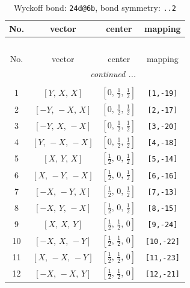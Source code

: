 \documentclass[fleqn,8pt]{jsarticle}
\begin{document}
\begin{longtable}{cccc}
\caption{Wyckoff bond: {\tt 24d@6b}, bond symmetry: {\tt ..2}}
 \\
 \hline \hline
No. & vector & center & mapping \\ \hline \endfirsthead

\multicolumn{3}{l}{\tablename\ \thetable{}} \\
 \hline \hline
No. & vector & center & mapping \\ \hline \endhead

 \hline \hline
\multicolumn{3}{r}{\footnotesize\it continued ...} \\ \endfoot

 \hline \hline
\multicolumn{3}{r}{} \\ \endlastfoot

1 & $\left[ Y,\, X,\, X \right]$ & $\left[ 0,\, \frac{1}{2},\, \frac{1}{2} \right]$ & {\tt [1,-19]} \\ \hline
2 & $\left[ - Y,\, - X,\, X \right]$ & $\left[ 0,\, \frac{1}{2},\, \frac{1}{2} \right]$ & {\tt [2,-17]} \\ \hline
3 & $\left[ - Y,\, X,\, - X \right]$ & $\left[ 0,\, \frac{1}{2},\, \frac{1}{2} \right]$ & {\tt [3,-20]} \\ \hline
4 & $\left[ Y,\, - X,\, - X \right]$ & $\left[ 0,\, \frac{1}{2},\, \frac{1}{2} \right]$ & {\tt [4,-18]} \\ \hline
5 & $\left[ X,\, Y,\, X \right]$ & $\left[ \frac{1}{2},\, 0,\, \frac{1}{2} \right]$ & {\tt [5,-14]} \\ \hline
6 & $\left[ X,\, - Y,\, - X \right]$ & $\left[ \frac{1}{2},\, 0,\, \frac{1}{2} \right]$ & {\tt [6,-16]} \\ \hline
7 & $\left[ - X,\, - Y,\, X \right]$ & $\left[ \frac{1}{2},\, 0,\, \frac{1}{2} \right]$ & {\tt [7,-13]} \\ \hline
8 & $\left[ - X,\, Y,\, - X \right]$ & $\left[ \frac{1}{2},\, 0,\, \frac{1}{2} \right]$ & {\tt [8,-15]} \\ \hline
9 & $\left[ X,\, X,\, Y \right]$ & $\left[ \frac{1}{2},\, \frac{1}{2},\, 0 \right]$ & {\tt [9,-24]} \\ \hline
10 & $\left[ - X,\, X,\, - Y \right]$ & $\left[ \frac{1}{2},\, \frac{1}{2},\, 0 \right]$ & {\tt [10,-22]} \\ \hline
11 & $\left[ X,\, - X,\, - Y \right]$ & $\left[ \frac{1}{2},\, \frac{1}{2},\, 0 \right]$ & {\tt [11,-23]} \\ \hline
12 & $\left[ - X,\, - X,\, Y \right]$ & $\left[ \frac{1}{2},\, \frac{1}{2},\, 0 \right]$ & {\tt [12,-21]} \\
\end{longtable}
\end{document}
